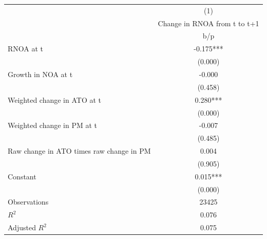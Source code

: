 {
\def\sym#1{\ifmmode^{#1}\else\(^{#1}\)\fi}
\begin{tabular}{l*{1}{c}}
\hline\hline
                    &\multicolumn{1}{c}{(1)}\\
                    &\multicolumn{1}{c}{Change in RNOA from t to t+1}\\
                    &         b/p   \\
\hline
RNOA at t           &      -0.175***\\
                    &     (0.000)   \\
Growth in NOA at t  &      -0.000   \\
                    &     (0.458)   \\
Weighted change in ATO at t&       0.280***\\
                    &     (0.000)   \\
Weighted change in PM at t&      -0.007   \\
                    &     (0.485)   \\
Raw change in ATO times raw change in PM&       0.004   \\
                    &     (0.905)   \\
Constant            &       0.015***\\
                    &     (0.000)   \\
\hline
Observations        &       23425   \\
\(R^{2}\)           &       0.076   \\
Adjusted \(R^{2}\)  &       0.075   \\
\hline\hline
\end{tabular}
}
